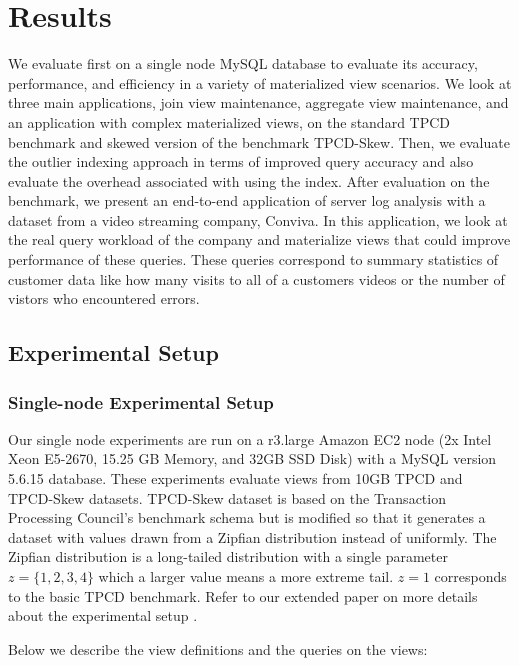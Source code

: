 \vspace{-.5em}
\section{Results}
\label{exp}
We evaluate \svc first on a single node MySQL database to evaluate its accuracy, performance, and efficiency in a variety of materialized view 
scenarios.
We look at three main applications, join view maintenance, aggregate view maintenance, and an application with complex materialized views, on the standard TPCD benchmark 
and skewed version of the benchmark TPCD-Skew.
Then, we evaluate the outlier indexing approach in terms of improved query accuracy and also evaluate the overhead associated with using the index.
After evaluation on the benchmark, we present an end-to-end application of server log analysis with a dataset from a video streaming company, Conviva.
In this application, we look at the real query workload of the company and materialize views that could improve performance of these queries.
These queries correspond to summary statistics of customer data like how many visits to all of a customers videos or the number of vistors who encountered errors.

\subsection{Experimental Setup}\vspace{-.5em}
\subsubsection{Single-node Experimental Setup}
Our single node experiments are run on a r3.large Amazon EC2 node (2x Intel Xeon E5-2670, 15.25 GB Memory, and 32GB SSD Disk) with a MySQL version 5.6.15 database.
These experiments evaluate views from 10GB TPCD and TPCD-Skew datasets.
TPCD-Skew dataset \cite{tpcdskew} is based on the Transaction Processing Council's benchmark
schema but is modified so that it generates a dataset with values drawn from a Zipfian distribution instead of uniformly.
The Zipfian distribution \cite{mitzenmacher2004brief} is a long-tailed distribution with a single parameter $z=\{1,2,3,4\}$ which a larger
value means a more extreme tail.
$z=1$ corresponds to the basic TPCD benchmark. 
Refer to our extended paper on more details about the experimental setup \cite{technicalReport}.

Below we describe the view definitions and the queries on the views:

